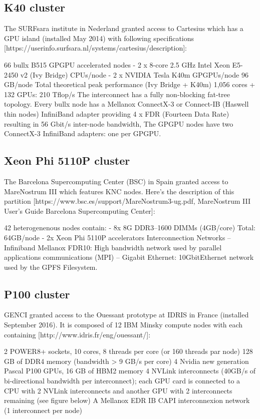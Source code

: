 \subsection{K40 cluster}
The SURFsara institute in Nederland granted access to Cartesius which has a GPU island (installed May 2014) with following specifications [https://userinfo.surfsara.nl/systems/cartesius/description]:

66 bullx B515 GPGPU accelerated nodes
 - 2 x 8-core 2.5 GHz Intel Xeon E5-2450 v2 (Ivy Bridge) CPUs/node
 - 2 x NVIDIA Tesla K40m GPGPUs/node
96 GB/node
Total theoretical peak performance (Ivy Bridge + K40m) 1,056 cores + 132 GPUs: 210 Tflop/s
The interconnect has a fully non-blocking fat-tree topology. Every bullx node has a Mellanox ConnectX-3 or Connect-IB (Haswell thin nodes) InfiniBand adapter providing 4 x FDR (Fourteen Data Rate) resulting in 56 Gbit/s inter-node bandwidth, The GPGPU nodes have two ConnectX-3 InfiniBand adapters: one per GPGPU.

\subsection{Xeon Phi 5110P cluster}
The Barcelona Supercomputing Center (BSC) in Spain granted access to MareNostrum III which features KNC nodes. Here's the description of this partition [https://www.bsc.es/support/MareNostrum3-ug.pdf, MareNostrum III User’s Guide Barcelona Supercomputing Center]:

42 heterogenenous nodes contain:
 - 8x 8G DDR3–1600 DIMMs (4GB/core) Total: 64GB/node
 - 2x Xeon Phi 5110P accelerators
Interconnection Networks
– Infiniband Mellanox FDR10: High bandwidth network used by parallel applications communications
(MPI)
– Gigabit Ethernet: 10GbitEthernet network used by the GPFS Filesystem.


\subsection{P100 cluster}
GENCI granted access to the Ouessant prototype at IDRIS in France (installed September 2016). It is composed of 12 IBM Minsky compute nodes with each containing [http://www.idris.fr/eng/ouessant/]:

2 POWER8+ sockets, 10 cores, 8 threads per core (or 160 threads par node)
128 GB of DDR4 memory (bandwidth > 9 GB/s per core)
4 Nvidia new generation Pascal P100 GPUs, 16 GB of HBM2 memory
4 NVLink interconnects (40GB/s of bi-directional bandwidth per interconnect); each GPU card is connected to a CPU with 2 NVLink interconnects and another GPU with 2 interconnects remaining (see figure below)
A Mellanox EDR IB CAPI interconnexion network (1 interconnect per node)


